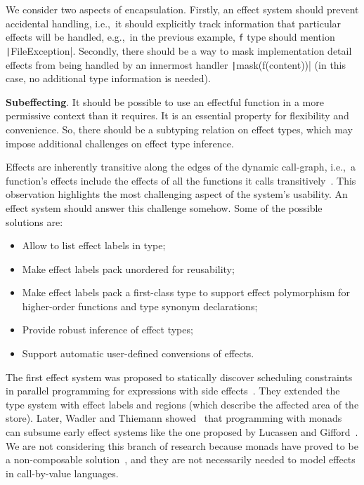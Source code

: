 \documentclass[conference]{IEEEtran}
\begin{document}
    We consider two aspects of encapsulation.
    Firstly, an effect system should prevent accidental handling, i.e.,\ it should explicitly track information that particular effects will be handled, e.g.,\ in the previous example, \texttt{f} type should mention \texttt|FileException|.
    Secondly, there should be a way to mask implementation detail effects from being handled by an innermost handler \texttt|mask(f(content))| (in this case, no additional type information is needed).

    \textbf{Subeffecting}.
    It should be possible to use an effectful function in a more permissive context than it requires.
    It is an essential property for flexibility and convenience.
    So, there should be a subtyping relation on effect types, which may impose additional challenges on effect type inference.


    Effects are inherently transitive along the edges of the dynamic call-graph, i.e.,\ a function's effects include the effects of all the functions it calls transitively~\cite{odersky2022scoped}.
    This observation highlights the most challenging aspect of the system's usability.
    An effect system should answer this challenge somehow.
    Some of the possible solutions are:
    \begin{itemize}
        \item Allow to list effect labels in type;
        \item Make effect labels pack unordered for reusability;
        \item Make effect labels pack a first-class type to support effect polymorphism for higher-order functions and type synonym declarations;
        \item Provide robust inference of effect types;
        \item Support automatic user-defined conversions of effects.
    \end{itemize}


    The first effect system was proposed to statically discover scheduling constraints in parallel programming for expressions with side effects~\cite{lucassen1988polymorphic}.
    They extended the type system with effect labels and regions (which describe the affected area of the store).
    Later, Wadler and Thiemann showed~\cite{wadler2003marriage} that programming with monads~\cite{moggi1988computational, wadler1995monads} can subsume early effect systems like the one proposed by Lucassen and Gifford~\cite{lucassen1988polymorphic}.
    We are not considering this branch of research because monads have proved to be a non-composable solution~\cite{liang1995monad, kiselyov2013extensible}, and they are not necessarily needed to model effects in call-by-value languages.
\end{document}
